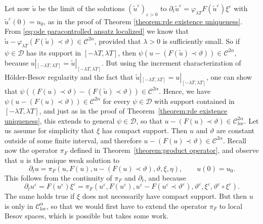 \documentclass[11pt,a4paper]{article}
\newcommand{\tmop}[1]{\ensuremath{\operatorname{#1}}}
\theoremstyle{remark}
\newcommand{\CC}{\ensuremath{\mathscr{C}}}
\newcommand{\CD}{\ensuremath{\mathscr{D}}}
\begin{document}
   Let now $\tilde{u}$ be the limit of the solutions $( \tilde{u}^{\varepsilon} )_{\varepsilon >0}$ to $\partial_{t} \tilde{u}^{\varepsilon} = \varphi_{\lambda T} F ( \tilde{u}^{\varepsilon} ) \xi^{\varepsilon}$ with
  $\tilde{u}^{\varepsilon} ( 0 ) =u_{0}$, as in the proof of Theorem
  \ref{theorem:rde existence uniqueness}. From {\eqref{eq:ode paracontrolled ansatz localized}} we know that $\tilde{u} - \varphi_{\lambda T} ( F ( \tilde{u} ) \prec \vartheta ) \in \CC^{2 \alpha}$, provided that
  $\lambda>0$ is sufficiently small. So if $\psi \in \CD$ has its
  support in $[ - \lambda T, \lambda T ]$, then $\psi ( u- ( F ( \tilde{u} ) \prec \vartheta ) ) \in \CC^{2 \alpha}$, because $u|_{[ - \lambda T, \lambda T ]} = \tilde{u} |_{[ - \lambda T, \lambda T ]}$. But using the
  increment characterization of H{\"o}lder-Besov regularity and the fact that
  $\tilde{u} |_{[ - \lambda T, \lambda T ]} =u|_{[ - \lambda T, \lambda T ]}$,
  one can show that $\psi ( ( F ( u ) \prec \vartheta ) - ( F ( \tilde{u} ) \prec \vartheta ) ) \in \CC^{2 \alpha}$. Hence, we have $\psi ( u- ( F ( u ) \prec \vartheta ) ) \in \CC^{2 \alpha}$ for every $\psi \in \CD$ with support contained in $[ - \lambda T, \lambda T ]$, and
  just as in the proof of Theorem~\ref{theorem:rde existence uniqueness}, this
  extends to general $\psi \in \CD$, so that $u- ( F ( u ) \prec \vartheta ) \in \CC^{2 \alpha}_{\tmop{loc}}$. Let us assume for
  simplicity that $\xi$ has compact support. Then $u$ and $\vartheta$ are constant outside of
  some finite interval, and therefore $u- ( F ( u ) \prec \vartheta ) \in \CC^{2 \alpha}$. Recall now the operator $\pi_{F}$ defined in
  Theorem~\ref{theorem:product operator}, and observe that $u$ is the unique weak
  solution to
  \[
     \partial_{t} u= \pi_{F} ( u,F ( u ) ,u- ( F ( u ) \prec \vartheta ) , \vartheta , \xi , \eta ) , \hspace{2em} u ( 0 ) =u_{0}.
  \]
  This follows
  from the continuity of $\pi_{F}$ and $\partial_t$, and because
  \[
     \partial_{t} u^{\varepsilon} =F ( u^{\varepsilon} ) \xi^{\varepsilon} =\pi_{F} ( u^{\varepsilon} ,F ( u^{\varepsilon} ) ,u^{\varepsilon} -F (u^{\varepsilon} \prec \vartheta^{\varepsilon} ) , \vartheta^{\varepsilon} , \xi^{\varepsilon} , \vartheta^{\varepsilon} \circ \xi^{\varepsilon} ) .
  \]
  The same holds true if $\xi$ does not necessarily have compact support. But
  then $u$ is only in $\CC^{\alpha}_{\tmop{loc}}$, so that we would first have to extend the operator $\pi_{F}$ to local Besov spaces, which is
  possible but takes some work.
\end{document}
